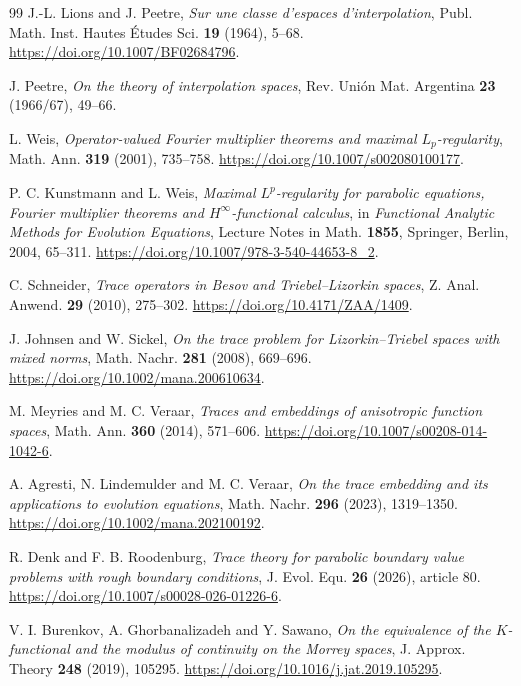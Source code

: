 \documentclass[smallextended,envcountsect,envcountsame]{svjour3}
\begin{document}
\begin{thebibliography}{99}
J.-L. Lions and J. Peetre,
\emph{Sur une classe d'espaces d'interpolation},
Publ. Math. Inst. Hautes \'Etudes Sci. \textbf{19} (1964), 5--68.
\url{https://doi.org/10.1007/BF02684796}.

J. Peetre,
\emph{On the theory of interpolation spaces},
Rev. Uni\'on Mat. Argentina \textbf{23} (1966/67), 49--66.

L. Weis,
\emph{Operator-valued Fourier multiplier theorems and maximal $L_p$-regularity},
Math. Ann. \textbf{319} (2001), 735--758.
\url{https://doi.org/10.1007/s002080100177}.

P. C. Kunstmann and L. Weis,
\emph{Maximal $L^p$-regularity for parabolic equations, Fourier multiplier theorems and $H^\infty$-functional calculus},
in \emph{Functional Analytic Methods for Evolution Equations}, Lecture Notes in Math. \textbf{1855}, Springer, Berlin, 2004, 65--311.
\url{https://doi.org/10.1007/978-3-540-44653-8_2}.

C. Schneider,
\emph{Trace operators in Besov and Triebel--Lizorkin spaces},
Z. Anal. Anwend. \textbf{29} (2010), 275--302.
\url{https://doi.org/10.4171/ZAA/1409}.

J. Johnsen and W. Sickel,
\emph{On the trace problem for Lizorkin--Triebel spaces with mixed norms},
Math. Nachr. \textbf{281} (2008), 669--696.
\url{https://doi.org/10.1002/mana.200610634}.

M. Meyries and M. C. Veraar,
\emph{Traces and embeddings of anisotropic function spaces},
Math. Ann. \textbf{360} (2014), 571--606.
\url{https://doi.org/10.1007/s00208-014-1042-6}.

A. Agresti, N. Lindemulder and M. C. Veraar,
\emph{On the trace embedding and its applications to evolution equations},
Math. Nachr. \textbf{296} (2023), 1319--1350.
\url{https://doi.org/10.1002/mana.202100192}.

R. Denk and F. B. Roodenburg,
\emph{Trace theory for parabolic boundary value problems with rough boundary conditions},
J. Evol. Equ. \textbf{26} (2026), article 80.
\url{https://doi.org/10.1007/s00028-026-01226-6}.

V. I. Burenkov, A. Ghorbanalizadeh and Y. Sawano,
\emph{On the equivalence of the $K$-functional and the modulus of continuity on the Morrey spaces},
J. Approx. Theory \textbf{248} (2019), 105295.
\url{https://doi.org/10.1016/j.jat.2019.105295}.


\end{thebibliography}
\end{document}
